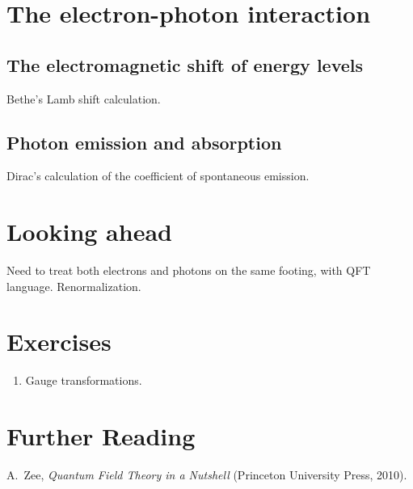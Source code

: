 \documentclass[pra,12pt]{revtex4}
\begin{document}
\section{The electron-photon interaction}

\subsection{The electromagnetic shift of energy levels}

Bethe's Lamb shift calculation.

\subsection{Photon emission and absorption}

Dirac's calculation of the coefficient of spontaneous emission.

\section{Looking ahead}

Need to treat both electrons and photons on the same footing, with QFT
language.  Renormalization.

\section*{Exercises}

\begin{enumerate}
\item Gauge transformations.
\end{enumerate}

\section*{Further Reading}

\begin{enumerate}[[1{]}]
\item A.~Zee, \textit{Quantum Field Theory in a Nutshell} (Princeton
  University Press, 2010).
\label{cite:zee}
\end{enumerate}
\end{document}
